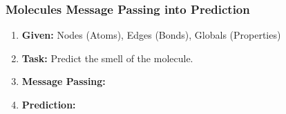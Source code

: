 \subsubsection{Molecules Message Passing into Prediction}
\begin{example}
    \begin{enumerate}
        \item \textbf{Given:} Nodes (Atoms), Edges (Bonds), Globals (Properties)
        \item \textbf{Task:} Predict the smell of the molecule. 
        \item \textbf{Message Passing:}
        \item \textbf{Prediction:}
    \end{enumerate}
\end{example}
\newpage


